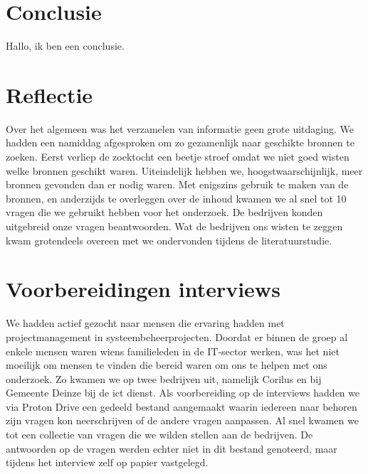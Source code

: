 \documentclass{article}
\begin{document}
    
    \section{Conclusie}
    
    Hallo, ik ben een conclusie.

    \newpage
    \printbibliography
    \section{Reflectie}
    Over het algemeen was het verzamelen van informatie geen grote uitdaging. We hadden een namiddag afgesproken om zo 
    gezamenlijk naar geschikte bronnen te zoeken. Eerst verliep de zoektocht een beetje stroef omdat we niet goed wisten welke bronnen 
    geschikt waren. Uiteindelijk hebben we, hoogstwaarschijnlijk, meer bronnen gevonden dan er nodig waren. Met 
    enigszins gebruik te maken van de bronnen, en anderzijds te overleggen over de inhoud kwamen we al snel tot 10 vragen die we gebruikt hebben voor het onderzoek. 
    De bedrijven konden uitgebreid onze vragen beantwoorden. Wat de bedrijven ons wisten te zeggen kwam grotendeels overeen 
    met we ondervonden tijdens de literatuurstudie.  
    \section{Voorbereidingen interviews}

    We hadden actief gezocht naar mensen die ervaring hadden met projectmanagement in systeembeheerprojecten.
    Doordat er binnen de groep al enkele mensen waren wiens familieleden in de IT-sector werken, was het niet moeilijk om mensen te vinden die bereid waren om ons te helpen met ons onderzoek.
    Zo kwamen we op twee bedrijven uit, namelijk Corilus en bij Gemeente Deinze bij de ict dienst. \newline
    Als voorbereiding op de interviews hadden we via Proton Drive een gedeeld bestand aangemaakt waarin iedereen naar behoren zijn vragen kon neerschrijven of de andere vragen aanpassen. 
    Al snel kwamen we tot een collectie van vragen die we wilden stellen aan de bedrijven.
    De antwoorden op de vragen werden echter niet in dit bestand genoteerd, maar tijdens het interview zelf op papier vastgelegd.
\end{document}
